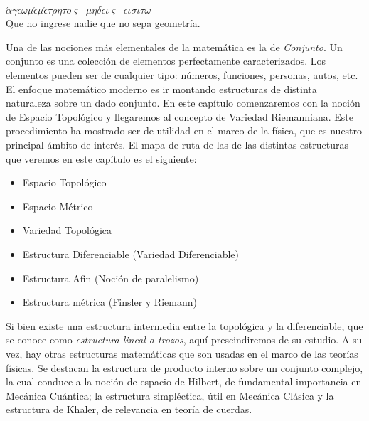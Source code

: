 
\begin{epigrafe}
$\acute{\alpha} \gamma\epsilon \omega \mu \acute{\epsilon} \mu \acute{\epsilon} \tau \rho \eta \tau o \varsigma \;\; \mu \eta \delta
\epsilon \iota \varsigma \;\; \epsilon \iota \sigma \iota \tau \omega$  \\
Que no ingrese nadie que no sepa geometr\'ia.
\end{epigrafe}


\label{s:3.1}

Una de las nociones m\'as elementales de la matem\'atica es la de {\it Conjunto}. Un conjunto es una colecci\'on de elementos perfectamente caracterizados. Los elementos pueden ser de cualquier tipo: n\'umeros, funciones, personas, autos, etc. El enfoque matem\'atico moderno es ir montando estructuras de distinta naturaleza sobre un dado conjunto. En este cap\'itulo comenzaremos con la noci\'on de Espacio Topol\'ogico y llegaremos al concepto de Variedad Riemanniana. Este procedimiento ha mostrado ser de utilidad en el marco de la f\'isica, que es nuestro principal \'ambito de inter\'es.
El mapa de ruta de las de las distintas estructuras que veremos en este cap\'itulo es el siguiente:
\begin{itemize}
\item Espacio Topol\'ogico
\item Espacio M\'etrico
\item Variedad Topol\'ogica
\item Estructura Diferenciable (Variedad Diferenciable)
\item Estructura Afin (Noci\'on de paralelismo)
\item Estructura m\'etrica (Finsler y Riemann)
\end{itemize}

Si bien existe una estructura intermedia entre la topol\'ogica y la diferenciable, que se conoce como {\it estructura lineal a trozos}, aquí prescindiremos de su estudio. A su vez, hay otras estructuras matem\'aticas que son usadas en el marco de las teor\'ias f\'isicas. Se destacan la estructura de producto interno sobre un conjunto complejo, la cual conduce a la noci\'on de espacio de Hilbert, de fundamental importancia en Mec\'anica Cu\'antica; la estructura simpl\'ectica, \'util en Mec\'anica Cl\'asica y la estructura de Khaler, de relevancia en teor\'ia de cuerdas.

